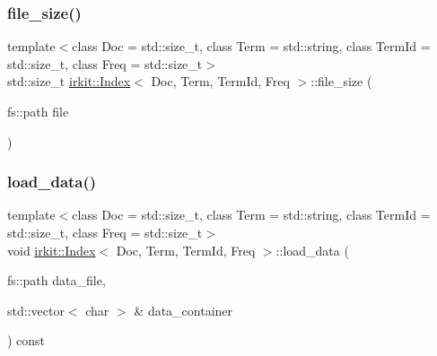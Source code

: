 \subsubsection{\texorpdfstring{file\+\_\+size()}{file\_size()}}
{\footnotesize\ttfamily template$<$class Doc  = std\+::size\+\_\+t, class Term  = std\+::string, class Term\+Id  = std\+::size\+\_\+t, class Freq  = std\+::size\+\_\+t$>$ \\
std\+::size\+\_\+t \hyperlink{classirkit_1_1Index}{irkit\+::\+Index}$<$ Doc, Term, Term\+Id, Freq $>$\+::file\+\_\+size (\begin{DoxyParamCaption}\item[{fs\+::path}]{file }\end{DoxyParamCaption})\hspace{0.3cm}{\ttfamily [inline]}}

\mbox{\label{classirkit_1_1Index_acdc1ba811044619795c2ab7eeed13abc}} 
\subsubsection{\texorpdfstring{load\+\_\+data()}{load\_data()}\hspace{0.1cm}{\footnotesize\ttfamily [1/2]}}
{\footnotesize\ttfamily template$<$class Doc  = std\+::size\+\_\+t, class Term  = std\+::string, class Term\+Id  = std\+::size\+\_\+t, class Freq  = std\+::size\+\_\+t$>$ \\
void \hyperlink{classirkit_1_1Index}{irkit\+::\+Index}$<$ Doc, Term, Term\+Id, Freq $>$\+::load\+\_\+data (\begin{DoxyParamCaption}\item[{fs\+::path}]{data\+\_\+file,  }\item[{std\+::vector$<$ char $>$ \&}]{data\+\_\+container }\end{DoxyParamCaption}) const\hspace{0.3cm}{\ttfamily [inline]}}

\mbox{\label{classirkit_1_1Index_a2dfd40f97f0022b075c8aaa38d96edc7}} 
